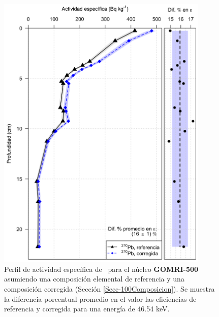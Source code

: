 \begin{figure}
\centering
\includegraphics[width=0.9\textwidth]{Imagenes/Act_210Pb_Agua_Composicion_GOMRI_500.png}
\caption{Perfil de actividad específica de \PbCero\, para el núcleo \textbf{GOMRI-500} asumiendo una composición elemental de referencia y una composición corregida (Sección \ref{Secc-100Composicion}). Se muestra la diferencia porcentual promedio en el valor las eficiencias de referencia y corregida para una energía de 46.54 keV.}\label{FigGOMRI500Agua}
\end{figure}
